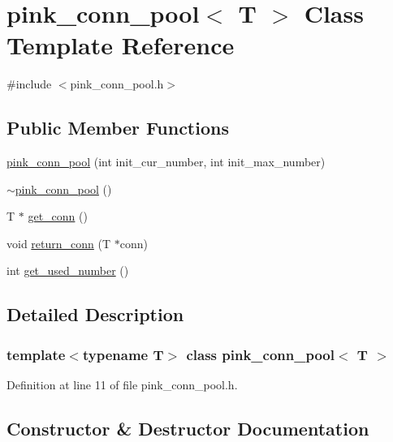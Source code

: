 \hypertarget{classpink__conn__pool}{}\section{pink\+\_\+conn\+\_\+pool$<$ T $>$ Class Template Reference}
\label{classpink__conn__pool}


{\ttfamily \#include $<$pink\+\_\+conn\+\_\+pool.\+h$>$}

\subsection*{Public Member Functions}
\begin{DoxyCompactItemize}
\item 
\hyperlink{classpink__conn__pool_a5c557c48815d595f7897f6abc8e55758}{pink\+\_\+conn\+\_\+pool} (int init\+\_\+cur\+\_\+number, int init\+\_\+max\+\_\+number)
\item 
\hyperlink{classpink__conn__pool_a292bf2f0711edeee62ee787eb72b9311}{$\sim$pink\+\_\+conn\+\_\+pool} ()
\item 
T $\ast$ \hyperlink{classpink__conn__pool_a1b053641006c7f00fd4764fea40f410c}{get\+\_\+conn} ()
\item 
void \hyperlink{classpink__conn__pool_a331df25708f142559d051ab8859ed707}{return\+\_\+conn} (T $\ast$conn)
\item 
int \hyperlink{classpink__conn__pool_a90965493d13fc28f0060ca6fed7d12a4}{get\+\_\+used\+\_\+number} ()
\end{DoxyCompactItemize}


\subsection{Detailed Description}
\subsubsection*{template$<$typename T$>$\newline
class pink\+\_\+conn\+\_\+pool$<$ T $>$}



Definition at line 11 of file pink\+\_\+conn\+\_\+pool.\+h.



\subsection{Constructor \& Destructor Documentation}
\mbox{\label{classpink__conn__pool_a5c557c48815d595f7897f6abc8e55758}} 
